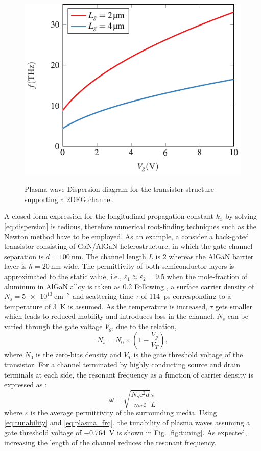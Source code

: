 \documentclass{ieeeaccess}
\renewcommand{\O}{\omega}  %
\newcommand{\E}{\varepsilon}  %
\renewcommand{\^}{\hat}  %
\newcommand{\e}{\mathrm{e}} %
\begin{document}
\begin{figure}[t!]
  {\includegraphics[height=.75\linewidth]{gate_swing.pdf}
  \label{fig:}}
  \caption{Plasma wave Dispersion diagram for the transistor structure supporting a 2DEG channel.}
\end{figure}

A closed-form expression for the longitudinal propagation constant $k_x$ by solving \eqref{eq:dispersion} is tedious, therefore numerical root-finding techniques such as the Newton method \cite{9780521880688} have to be employed. As an example, a consider a back-gated transistor consisting of GaN/AlGaN heterostructure, in which the gate-channel separation is $d = \SI{100}{\nm}$. The channel length $L$ is \SI{2}{\micm} whereas the AlGaN barrier layer is $h = \SI{20}{\nm}$ wide.
The permittivity of both semiconductor layers is approximated to the static value, i.e., $\E_1 \approx \E_2 = 9.5$ when the mole-fraction of aluminum in AlGaN alloy is taken as \SI{.2}{} Following \cite{Muravjov2010}, a surface carrier density of $N_s = \SI{5e13}{\cm^{-2}}$ and scattering time $\tau$ of \SI{114}{\ps} corresponding to a temperature of \SI{3}{\kelvin} is assumed. As the temperature is increased, $\tau$ gets smaller which leads to reduced mobility and introduces loss in the channel. $N_s$ can be varied through the gate voltage $V_g$, due to the relation,
%
\begin{equation}
  N_s = N_0 \times \left(1 - \frac{V_g}{V_T} \right),
  \label{eq:tunability}
\end{equation}
%
where $N_0$ is the zero-bias density and $V_T$ is the gate threshold voltage of the transistor. For a channel terminated by highly conducting source and drain terminals at each side, the resonant frequency as a function of carrier density is expressed as \cite{Popov2008}:
%
\begin{equation}
  \O = \sqrt{\frac{N_s \e^2 d}{m_{\ast} \E}} \frac{\pi}{L}
  \label{eq:plasma_frq}
\end{equation}
%
where $\E$ is the average permittivity of the surrounding media. Using \eqref{eq:tunability} and \eqref{eq:plasma_frq}, the tunability of plasma waves assuming a gate threshold voltage of \SI{-.764}{\volt} is shown in Fig. \ref{fig:tuning}. As expected, increasing the length of the channel reduces the resonant frequency.
\end{document}

